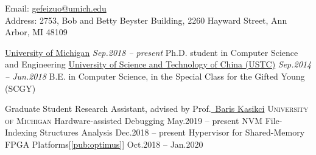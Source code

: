 \documentclass[10pt,a4paper]{article}
\newcommand{\seperator}{\spacedhrule{0.5em}{-1em}}
\begin{document}
\sloppy  %



\nobreakvspace{0.3em}  %

\noindent Email: \href{mailto:gefeizuo@umich.edu}{\mbox{gefeizuo@umich.edu}}
\\
Address: 2753, Bob and Betty Beyster Building, 2260 Hayward Street, Ann Arbor, MI 48109

\seperator  %

\headedsection
{\href{https://umich.edu}{University of Michigan}}
{\textit{Sep.2018 -- present}}
{
	\headedsubsection
	{Ph.D. student in Computer Science and Engineering}
	{}
	{}
}
\headedsection  %
{\href{http://ustc.edu.cn/}{University of Science and Technology of China (USTC)}}
{\textit{Sep.2014 -- Jun.2018}} {
	\headedsubsection
	{B.E. in Computer Science, in the Special Class for the Gifted Young (SCGY)}
	{}
	{}
}

\seperator


\headedsection
{Graduate Student Research Assistant, advised by Prof.\href{https://web.eecs.umich.edu/~barisk/}{\ Baris Kasikci}}
{\textsc{University of Michigan}}
{
	\headedsubsection
	{Hardware-assisted Debugging}
	{May.2019 -- present}
	{}
	\headedsubsection
	{NVM File-Indexing Structures Analysis}
	{Dec.2018 -- present}
	{}
	\headedsubsection
	{Hypervisor for Shared-Memory FPGA Platforms[\ref{pub:optimus}]}
	{Oct.2018 -- Jan.2020}
	{}
}
\end{document}

